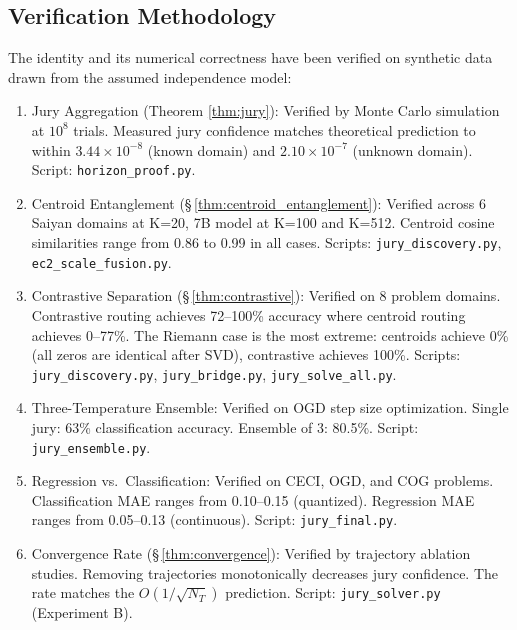\documentclass[11pt]{article}
\begin{document}
\subsection{Verification Methodology}

The identity and its numerical correctness have been verified on synthetic data drawn from the assumed independence model:

\begin{enumerate}[nosep]
\item Jury Aggregation (Theorem \ref{thm:jury}): Verified by Monte Carlo simulation at $10^8$ trials. Measured jury confidence matches theoretical prediction to within $3.44 \times 10^{-8}$ (known domain) and $2.10 \times 10^{-7}$ (unknown domain). Script: \texttt{horizon\_proof.py}.

\item Centroid Entanglement (\S\,\ref{thm:centroid_entanglement}): Verified across 6 Saiyan domains at K=20, 7B model at K=100 and K=512. Centroid cosine similarities range from 0.86 to 0.99 in all cases. Scripts: \texttt{jury\_discovery.py}, \texttt{ec2\_scale\_fusion.py}.

\item Contrastive Separation (\S\,\ref{thm:contrastive}): Verified on 8 problem domains. Contrastive routing achieves 72--100\% accuracy where centroid routing achieves 0--77\%. The Riemann case is the most extreme: centroids achieve 0\% (all zeros are identical after SVD), contrastive achieves 100\%. Scripts: \texttt{jury\_discovery.py}, \texttt{jury\_bridge.py}, \texttt{jury\_solve\_all.py}.

\item Three-Temperature Ensemble: Verified on OGD step size optimization. Single jury: 63\% classification accuracy. Ensemble of 3: 80.5\%. Script: \texttt{jury\_ensemble.py}.

\item Regression vs.\ Classification: Verified on CECI, OGD, and COG problems. Classification MAE ranges from 0.10--0.15 (quantized). Regression MAE ranges from 0.05--0.13 (continuous). Script: \texttt{jury\_final.py}.

\item Convergence Rate (\S\,\ref{thm:convergence}): Verified by trajectory ablation studies. Removing trajectories monotonically decreases jury confidence. The rate matches the $O(1/\sqrt{N_T})$ prediction. Script: \texttt{jury\_solver.py} (Experiment B).
\end{enumerate}
\end{document}
